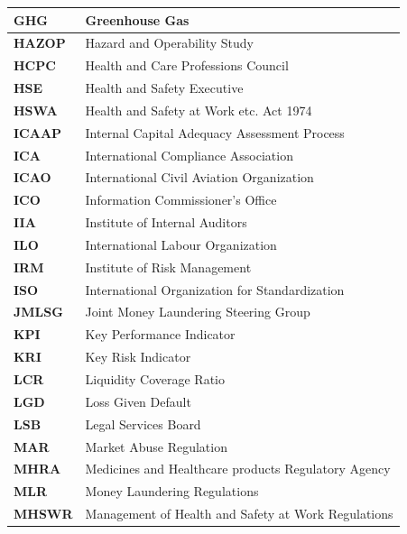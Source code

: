 \begin{longtable}{ | >{\raggedright\arraybackslash}p{} 
                  | >{\raggedright\arraybackslash}p{} | }
        \textbf{GHG} & Greenhouse Gas \\
        \hline
        \textbf{HAZOP} & Hazard and Operability Study \\
        \hline
        \textbf{HCPC} & Health and Care Professions Council \\
        \hline
        \textbf{HSE} & Health and Safety Executive \\
        \hline
        \textbf{HSWA} & Health and Safety at Work etc. Act 1974 \\
        \hline
        \textbf{ICAAP} & Internal Capital Adequacy Assessment Process \\
        \hline
        \textbf{ICA} & International Compliance Association \\
        \hline
        \textbf{ICAO} & International Civil Aviation Organization \\
        \hline
        \textbf{ICO} & Information Commissioner's Office \\
        \hline
        \textbf{IIA} & Institute of Internal Auditors \\
        \hline
        \textbf{ILO} & International Labour Organization \\
        \hline
        \textbf{IRM} & Institute of Risk Management \\
        \hline
        \textbf{ISO} & International Organization for Standardization \\
        \hline
        \textbf{JMLSG} & Joint Money Laundering Steering Group \\
        \hline
        \textbf{KPI} & Key Performance Indicator \\
        \hline
        \textbf{KRI} & Key Risk Indicator \\
        \hline
        \textbf{LCR} & Liquidity Coverage Ratio \\
        \hline
        \textbf{LGD} & Loss Given Default \\
        \hline
        \textbf{LSB} & Legal Services Board \\
        \hline
        \textbf{MAR} & Market Abuse Regulation \\
        \hline
        \textbf{MHRA} & Medicines and Healthcare products Regulatory Agency \\
        \hline
        \textbf{MLR} & Money Laundering Regulations \\
        \hline
        \textbf{MHSWR} & Management of Health and Safety at Work Regulations \\

\end{longtable}
